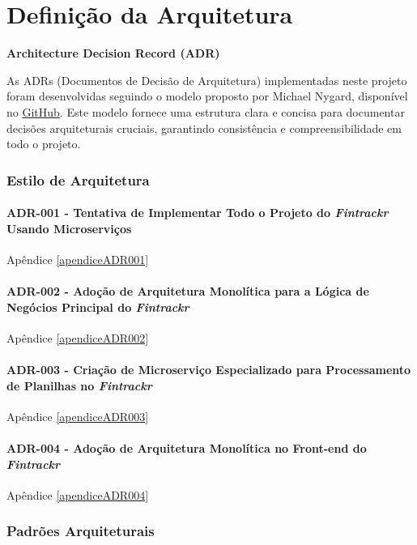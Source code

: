 \chapter{Definição da Arquitetura}

\noindent
\textbf{Architecture Decision Record (ADR)}

As ADRs (Documentos de Decisão de Arquitetura) implementadas neste projeto foram desenvolvidas seguindo o modelo proposto por Michael Nygard, disponível no \href{https://github.com/joelparkerhenderson/architecture-decision-record/blob/main/locales/en/templates/decision-record-template-by-michael-nygard/index.md}{GitHub}. Este modelo fornece uma estrutura clara e concisa para documentar decisões arquiteturais cruciais, garantindo consistência e compreensibilidade em todo o projeto.


\subsection{Estilo de Arquitetura}

\subsubsection*{ADR-001 - Tentativa de Implementar Todo o Projeto do \textit{Fintrackr} Usando Microserviços}
Apêndice \ref{apendiceADR001}

\subsubsection*{ADR-002 - Adoção de Arquitetura Monolítica para a Lógica de Negócios Principal do \textit{Fintrackr}}
Apêndice \ref{apendiceADR002}

\subsubsection*{ADR-003 - Criação de Microserviço Especializado para Processamento de Planilhas no \textit{Fintrackr}}
Apêndice \ref{apendiceADR003}

\subsubsection*{ADR-004 - Adoção de Arquitetura Monolítica no Front-end do \textit{Fintrackr}}
Apêndice \ref{apendiceADR004}


\subsection{Padrões Arquiteturais}


